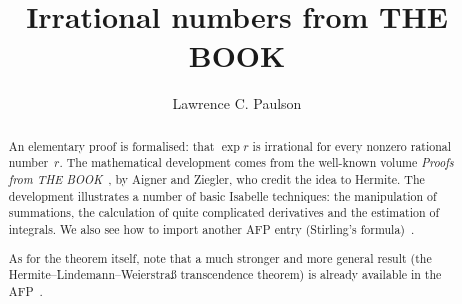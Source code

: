 \documentclass[11pt,a4paper]{article}
\begin{document}
\title{Irrational numbers from THE BOOK}
\author{Lawrence C. Paulson}
\maketitle

\begin{abstract}
An elementary proof is formalised: that $\exp r$ is irrational for every nonzero rational number~$r$. The mathematical development comes from the well-known volume \emph{Proofs from THE BOOK}~\cite[pp.--2]{aigner-proofs}, by Aigner and Ziegler, who credit the idea to Hermite. The development illustrates a number of basic Isabelle techniques: the manipulation of summations, the calculation of quite complicated derivatives and the estimation of integrals.
We also see how to import another AFP entry (Stirling's formula)~\cite{Stirling_Formula-AFP}.

As for the theorem itself, note that a much stronger and more general result (the Hermite--Lindemann--Weierstra\ss{} transcendence theorem) is already available in the AFP~\cite{Hermite_Lindemann-AFP}.
\end{abstract}

\newpage
\tableofcontents
\newpage





\end{document}

